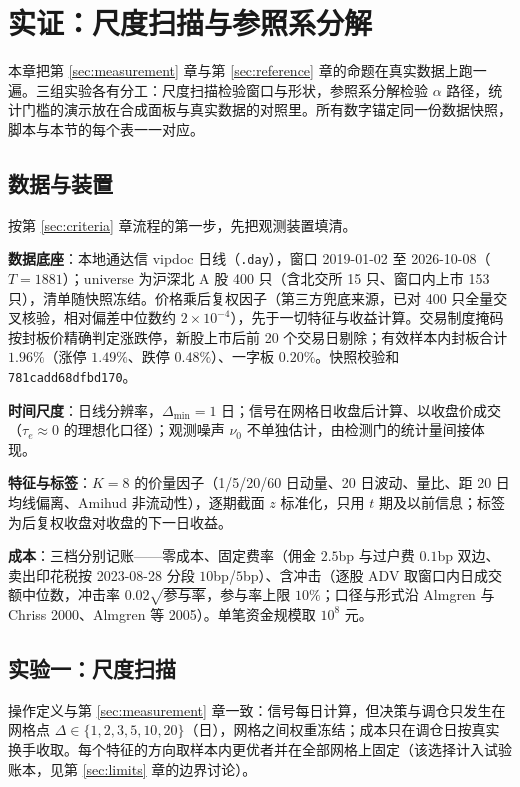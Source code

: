 \section{实证：尺度扫描与参照系分解}\label{sec:empirical}

本章把第 \ref{sec:measurement} 章与第 \ref{sec:reference} 章的命题在真实数据上跑一遍。三组实验各有分工：尺度扫描检验窗口与形状，参照系分解检验 $\alpha$ 路径，统计门槛的演示放在合成面板与真实数据的对照里。所有数字锚定同一份数据快照，脚本与本节的每个表一一对应。

\subsection{数据与装置}

按第 \ref{sec:criteria} 章流程的第一步，先把观测装置填清。

\textbf{数据底座}：本地通达信 vipdoc 日线（\texttt{.day}），窗口 2019-01-02 至 2026-10-08（$T=1881$）；universe 为沪深北 A 股 400 只（含北交所 15 只、窗口内上市 153 只），清单随快照冻结。价格乘后复权因子（第三方兜底来源，已对 400 只全量交叉核验，相对偏差中位数约 $2\times10^{-4}$），先于一切特征与收益计算。交易制度掩码按封板价精确判定涨跌停，新股上市后前 20 个交易日剔除；有效样本内封板合计 $1.96\%$（涨停 $1.49\%$、跌停 $0.48\%$）、一字板 $0.20\%$。快照校验和 \texttt{781cadd68dfbd170}。

\textbf{时间尺度}：日线分辨率，$\Delta_{\min}=1$ 日；信号在网格日收盘后计算、以收盘价成交（$\tau_e\approx0$ 的理想化口径）；观测噪声 $\nu_0$ 不单独估计，由检测门的统计量间接体现。

\textbf{特征与标签}：$K=8$ 的价量因子（1/5/20/60 日动量、20 日波动、量比、距 20 日均线偏离、Amihud 非流动性\cite{amihud2002}），逐期截面 $z$ 标准化，只用 $t$ 期及以前信息；标签为后复权收盘对收盘的下一日收益。

\textbf{成本}：三档分别记账——零成本、固定费率（佣金 $2.5$bp 与过户费 $0.1$bp 双边、卖出印花税按 2023-08-28 分段 $10$bp/$5$bp）、含冲击（逐股 ADV 取窗口内日成交额中位数，冲击率 $0.02\sqrt{\text{参与率}}$，参与率上限 $10\%$；口径与形式沿 Almgren 与 Chriss 2000\cite{almgrenchriss2000}、Almgren 等 2005\cite{almgren2005}）。单笔资金规模取 $10^8$ 元。

\subsection{实验一：尺度扫描}

操作定义与第 \ref{sec:measurement} 章一致：信号每日计算，但决策与调仓只发生在网格点 $\Delta\in\{1,2,3,5,10,20\}$（日），网格之间权重冻结；成本只在调仓日按真实换手收取。每个特征的方向取样本内更优者并在全部网格上固定（该选择计入试验账本，见第 \ref{sec:limits} 章的边界讨论）。

